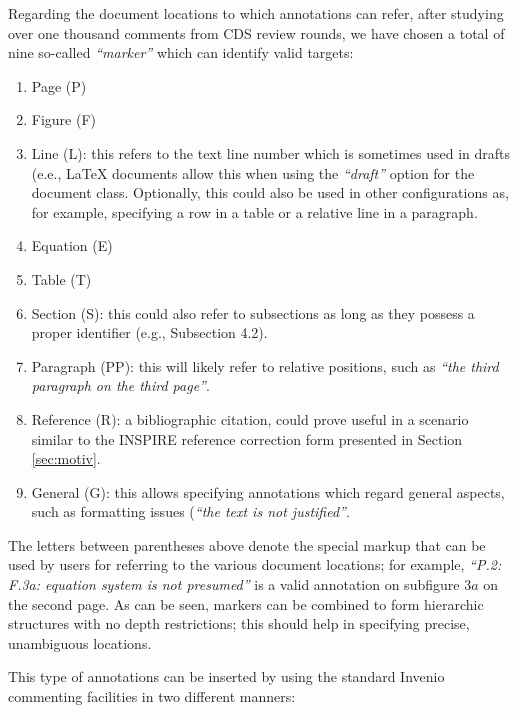 Regarding the document locations to which annotations can refer, after studying
over one thousand comments from CDS review rounds, we have chosen a total of
nine so-called \textit{``marker''} which can identify valid targets:
\begin{enumerate}
  \item Page (P)
  \item Figure (F)
  \item Line (L): this refers to the text line number which is sometimes used
                  in drafts (e.e., LaTeX documents allow this when using the
                  \textit{``draft''} option for the document class. Optionally,
                  this could also be used in other configurations as, for
                  example, specifying a row in a table or a relative line in a
                  paragraph.
  \item Equation (E)
  \item Table (T)
  \item Section (S): this could also refer to subsections as long as they
                     possess a proper identifier (e.g., Subsection 4.2).
  \item Paragraph (PP): this will likely refer to relative positions, such
                        as \textit{``the third paragraph on the third page''}.
  \item Reference (R): a bibliographic citation, could prove useful in a
                       scenario similar to the INSPIRE reference correction 
                       form presented in Section \ref{sec:motiv}.
  \item General (G): this allows specifying annotations which regard general
                     aspects, such as formatting issues (\textit{``the text is
                     not justified''}.
\end{enumerate}
The letters between parentheses above denote the special markup that can be used
by users for referring to the various document locations; for example,
\textit{``P.2: F.3a: equation system is not presumed''} is a valid annotation
on subfigure $3a$ on the second page. As can be seen, markers can be combined to
form hierarchic structures with no depth restrictions; this should help in
specifying precise, unambiguous locations.

This type of annotations can be inserted by using the standard Invenio
commenting facilities in two different manners:

